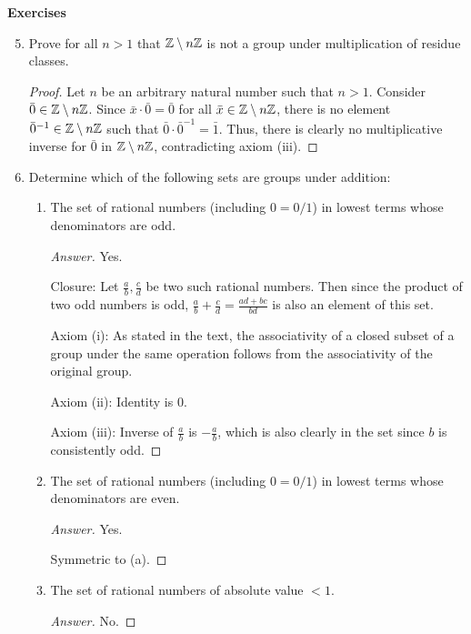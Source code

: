 \documentclass[../main.tex]{subfiles}
\begin{document}
\noindent\textbf{Exercises}
\begin{enumerate}[label={\textbf{\arabic*.}}]
    \setcounter{enumi}{4}
    \item Prove for all $n>1$ that $\mathbb{Z}\setminus n\mathbb{Z}$ is not a group under multiplication of residue classes.
    \begin{proof}
        Let $n$ be an arbitrary natural number such that $n>1$. Consider $\bar{0}\in\mathbb{Z}\setminus n\mathbb{Z}$. Since $\bar{x}\cdot\bar{0}=\bar{0}$ for all $\bar{x}\in\mathbb{Z}\setminus n\mathbb{Z}$, there is no element $\bar{0}^{-1}\in\mathbb{Z}\setminus n\mathbb{Z}$ such that $\bar{0}\cdot\bar{0}^{-1}=\bar{1}$. Thus, there is clearly no multiplicative inverse for $\bar{0}$ in $\mathbb{Z}\setminus n\mathbb{Z}$, contradicting axiom (iii).
    \end{proof}
    \item Determine which of the following sets are groups under addition:
    \begin{enumerate}[label={\textbf{(\alph*)}}]
        \item The set of rational numbers (including $0=0/1$) in lowest terms whose denominators are odd.
        \begin{proof}[Answer]
            Yes.\par
            Closure: Let $\frac{a}{b},\frac{c}{d}$ be two such rational numbers. Then since the product of two odd numbers is odd, $\frac{a}{b}+\frac{c}{d}=\frac{ad+bc}{bd}$ is also an element of this set.\par
            Axiom (i): As stated in the text, the associativity of a closed subset of a group under the same operation follows from the associativity of the original group.\par
            Axiom (ii): Identity is 0.\par
            Axiom (iii): Inverse of $\frac{a}{b}$ is $-\frac{a}{b}$, which is also clearly in the set since $b$ is consistently odd.
        \end{proof}
        \item The set of rational numbers (including $0=0/1$) in lowest terms whose denominators are even.
        \begin{proof}[Answer]
            Yes.\par
            Symmetric to (a).
        \end{proof}
        \item The set of rational numbers of absolute value $<1$.
        \begin{proof}[Answer]
            No.\par

\end{proof}
\end{enumerate}
\end{enumerate}
\end{document}
